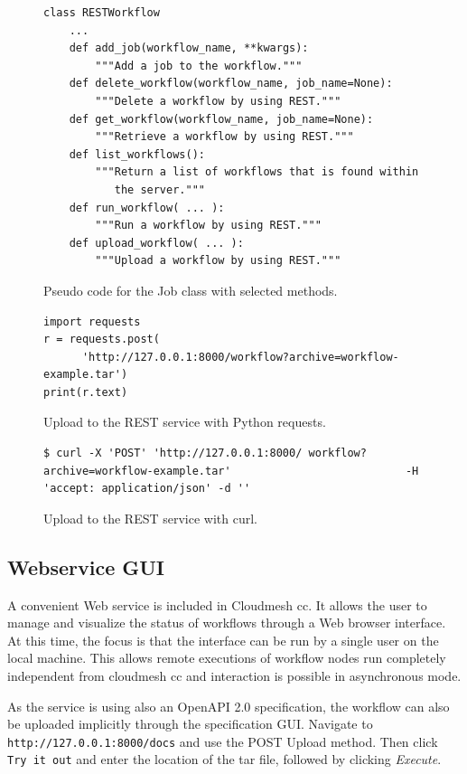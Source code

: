 \begin{figure}[t]
\begin{verbatim}
class RESTWorkflow
    ...
    def add_job(workflow_name, **kwargs):
        """Add a job to the workflow."""
    def delete_workflow(workflow_name, job_name=None):
        """Delete a workflow by using REST."""
    def get_workflow(workflow_name, job_name=None):
        """Retrieve a workflow by using REST."""
    def list_workflows():
        """Return a list of workflows that is found within
           the server."""
    def run_workflow( ... ):
        """Run a workflow by using REST."""
    def upload_workflow( ... ):
        """Upload a workflow by using REST."""
\end{verbatim}
\caption{Pseudo code for the Job class with selected methods.}
\label{fig:code-workflow-rest-commandline}

\bigskip

\begin{verbatim}
import requests
r = requests.post(
      'http://127.0.0.1:8000/workflow?archive=workflow-example.tar')
print(r.text)
\end{verbatim}
\caption{Upload to the REST service with Python requests.}
\label{fig:code-workflow-requests}

\bigskip

\begin{verbatim}
$ curl -X 'POST' 'http://127.0.0.1:8000/ workflow?archive=workflow-example.tar'                           -H 'accept: application/json' -d ''
\end{verbatim}
\caption{Upload to the REST service with curl.}
\label{fig:code-workflow-curl}

\end{figure}


\subsection{Webservice GUI}

A convenient Web service is included in Cloudmesh cc. It allows the
user to manage and visualize the status of workflows through a Web
browser interface. At this time, the focus is that the interface can
be run by a single user on the local machine. This allows remote
executions of workflow nodes run completely independent from cloudmesh
cc and interaction is possible in asynchronous mode.

As the service is using also an OpenAPI 2.0 specification, the
workflow can also be uploaded implicitly through the specification
GUI. Navigate to {\scriptsize \texttt{http://127.0.0.1:8000/docs}} and
use the POST Upload method. Then click \texttt{Try\ it\ out} and enter
the location of the tar file, followed by clicking {\em Execute}.

